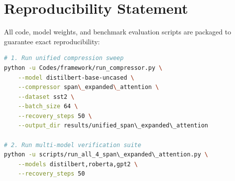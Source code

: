 \section{Reproducibility Statement}
All code, model weights, and benchmark evaluation scripts are packaged to guarantee exact reproducibility:
\begin{lstlisting}[language=bash]
# 1. Run unified compression sweep
python -u Codes/framework/run_compressor.py \
    --model distilbert-base-uncased \
    --compressor span\_expanded\_attention \
    --dataset sst2 \
    --batch_size 64 \
    --recovery_steps 50 \
    --output_dir results/unified_span\_expanded\_attention

# 2. Run multi-model verification suite
python -u scripts/run_all_4_span\_expanded\_attention.py \
    --models distilbert,roberta,gpt2 \
    --recovery_steps 50
\end{lstlisting}
